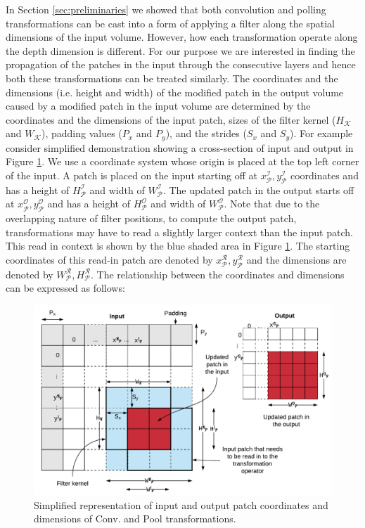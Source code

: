 In Section \ref{sec:preliminaries} we showed that both convolution and polling transformations can be cast into a form of applying a filter along the spatial dimensions of the input volume.
However, how each transformation operate along the depth dimension is different.
For our purpose we are interested in finding the propagation of the patches in the input through the consecutive layers and hence both these transformations can be treated similarly.
The coordinates and the dimensions (i.e. height and width) of the modified patch in the output volume caused by a modified patch in the input volume are determined by the coordinates and the dimensions of the input patch, sizes of the filter kernel ($H_\mathcal{K}$ and $W_\mathcal{K}$), padding values ($P_x$ and $P_y$), and the strides ($S_x$ and $S_y$).
For example consider simplified demonstration showing a cross-section of input and output in Figure \ref{fig:dimensions}.
We use a coordinate system whose origin is placed at the top left corner of the input.
A patch is placed on the input starting off at $x^\mathcal{I}_\mathcal{P}, y^\mathcal{I}_\mathcal{P}$ coordinates and has a height of $H^\mathcal{I}_\mathcal{P}$ and width of $W^\mathcal{I}_\mathcal{P}$.
The updated patch in the output starts off at $x^\mathcal{O}_\mathcal{P}, y^\mathcal{O}_\mathcal{P}$ and has a height of $H^\mathcal{O}_\mathcal{P}$ and width of $W^\mathcal{O}_\mathcal{P}$.
Note that due to the overlapping nature of filter positions, to compute the output patch, transformations may have to read a slightly larger context than the input patch. This read in context is shown by the blue shaded area in Figure \ref{fig:dimensions}.
The starting coordinates of this read-in patch are denoted by $x^\mathcal{R}_\mathcal{P}, y^\mathcal{R}_\mathcal{P}$ and the dimensions are denoted by $W^\mathcal{R}_\mathcal{P}, H^\mathcal{R}_\mathcal{P}$.
The relationship between the coordinates and dimensions can be expressed as follows:

\begin{figure}[t]
\includegraphics[width=\columnwidth]{images/dimensions}
\caption{Simplified representation of input and output patch coordinates and dimensions of Conv. and Pool transformations.}
\label{fig:dimensions}
\end{figure}

